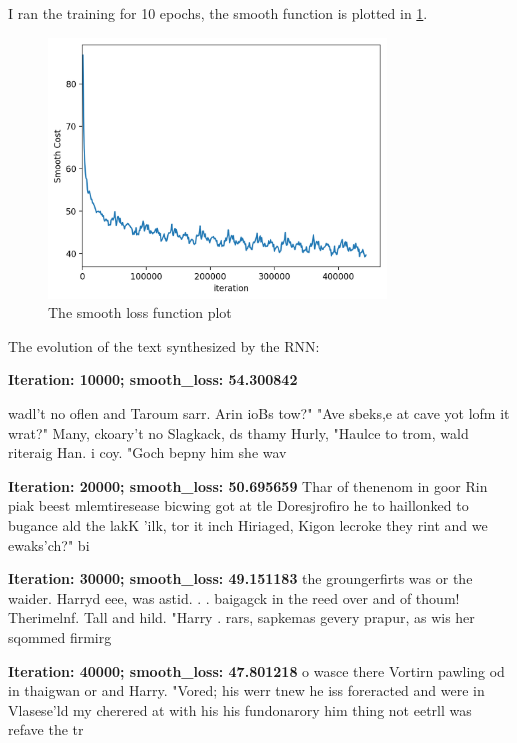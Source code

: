\documentclass[12pt]{article}
\newenvironment{question}[2][Question]{\begin{trivlist}
\kern10pt
\item[\hskip \labelsep {\bfseries #1}\hskip \labelsep {\bfseries #2.}]}{\end{trivlist}}
\begin{document}
\begin{question}{ii}
I ran the training for 10 epochs, the smooth function is plotted in 
\cref{plt:smooth_lost_basic_rnn}.

\begin{figure}[h]
    \centering
    \includegraphics[width=0.8\textwidth]{./basic_cost.png}
    \caption{The smooth loss function plot}
    \label{plt:smooth_lost_basic_rnn}
\end{figure}
\end{question}

\begin{question}{iii}
The evolution of the text synthesized by the RNN:

\textbf{Iteration: 10000; smooth\_loss: 54.300842}

wadl't no oflen and Taroum sarr.  Arin ioBs tow?"
"Ave sbeks,e at cave yot lofm it wrat?"
Many, ckoary't no Slagkack, ds thamy Hurly, "Haulce to trom, wald riteraig Han. i coy.
"Goch bepny him she wav

\textbf{Iteration: 20000; smooth\_loss: 50.695659} 
Thar of thenenom in goor Rin piak beest mlemtiresease bicwing got at tle Doresjrofiro he to haillonked to bugance ald the lakK 'ilk, tor it inch Hiriaged, Kigon lecroke they rint and we ewaks'ch?"  bi

\textbf{Iteration: 30000; smooth\_loss: 49.151183} 
the groungerfirts was or the waider.  Harryd eee, was astid. . . baigagck in the reed over and of thoum!  Therimelnf.  Tall and hild.  "Harry . rars, sapkemas gevery prapur, as wis her sqommed firmirg

\textbf{Iteration: 40000; smooth\_loss: 47.801218} 
o wasce there Vortirn pawling od in thaigwan or and Harry.
"Vored; his werr tnew he iss foreracted and were in Vlasese'ld my cherered at with his his fundonarory him thing not eetrll was refave the tr

\end{question}
\end{document}
